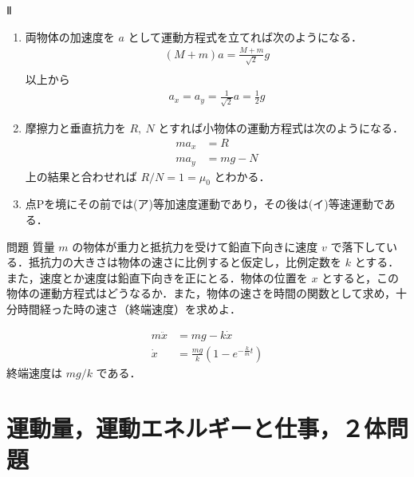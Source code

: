 \documentclass[
  b4paperpaper,
  xelatex,ja=standard]{bxjsbook}
\providecommand{\tightlist}{%
  \setlength{\itemsep}{0pt}\setlength{\parskip}{0pt}}\usepackage{longtable,booktabs,array}
\begin{document}
Ⅱ

\begin{enumerate}
\def\labelenumi{\arabic{enumi}.}
\tightlist
\item
  両物体の加速度を \(a\) として運動方程式を立てれば次のようになる．
  \begin{align*}
  (M+m)a=\frac{M+m}{\sqrt{2}}g\\
  \end{align*} 以上から \begin{align*}
  a_x=a_y=\frac{1}{\sqrt{2}}a=\frac{1}{2}g
  \end{align*}
\item
  摩擦力と垂直抗力を \(R,\:N\)
  とすれば小物体の運動方程式は次のようになる． \begin{align*}
  ma_x&=R\\
  ma_y&=mg-N
  \end{align*} 上の結果と合わせれば \(R/N=1=\mu_0\) とわかる．
\item
  点Pを境にその前では(ア)等加速度運動であり，その後は(イ)等速運動である．
\end{enumerate}

\begin{Qbox}{問題}
質量 \(m\) の物体が重力と抵抗力を受けて鉛直下向きに速度 \(v\)
で落下している．抵抗力の大きさは物体の速さに比例すると仮定し，比例定数を
\(k\) とする．また，速度とか速度は鉛直下向きを正にとる．物体の位置を
\(x\)
とすると，この物体の運動方程式はどうなるか．また，物体の速さを時間の関数として求め，十分時間経った時の速さ（終端速度）を求めよ．

\end{Qbox}


\begin{align*}
m\ddot{x}&=mg-k\dot{x}\\
\dot{x} &= \frac{mg}{k}\left(1-e^{-\frac{k}{m}t}\right)
\end{align*} 終端速度は \(mg/k\) である．


\hypertarget{ux904bux52d5ux91cfux904bux52d5ux30a8ux30cdux30ebux30aeux30fcux3068ux4ed5ux4e8buxff12ux4f53ux554fux984c}{%
\chapter{運動量，運動エネルギーと仕事，２体問題}\label{ux904bux52d5ux91cfux904bux52d5ux30a8ux30cdux30ebux30aeux30fcux3068ux4ed5ux4e8buxff12ux4f53ux554fux984c}}
\end{document}
